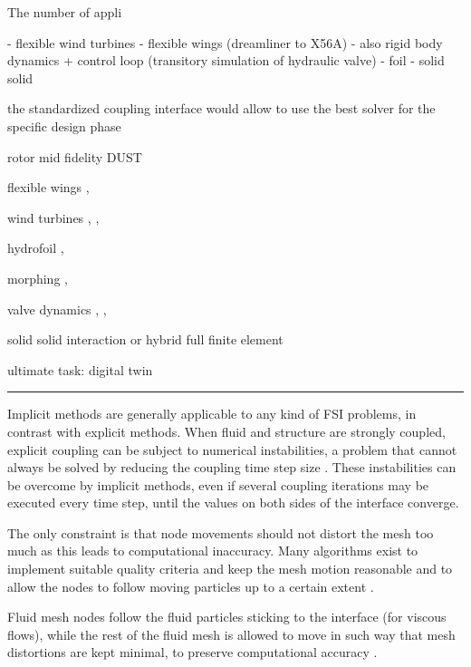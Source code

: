 The number of appli


- flexible wind turbines
- flexible wings (dreamliner to X56A)
- also rigid body dynamics + control loop (transitory simulation of hydraulic valve)
- foil
- solid solid 




the standardized coupling interface would allow to use the best solver for the specific design phase 

rotor \cite{quaranta2004toward}  \cite{cavagna2009simulation}  \cite{masarati2011coupled} mid fidelity DUST \cite{cocco2020simulation}

flexible wings \cite{pusch2019aeroelastic}, \cite{waitman2020h}

wind turbines \cite{guerri2008fluid}, \cite{rasheed2014comprehensive}, \cite{roul2020fluid} 

hydrofoil \cite{lupu2018absolute}, \cite{bousquet2017control}

morphing \cite{chanzy2018analysis}, \cite{li2018review}

valve dynamics \cite{amirante2006flow}, \cite{lisowski2013three}, \cite{frosina2017modeling}

solid solid interaction or hybrid full finite element \cite{cumnuantip2018assessment}



ultimate task: digital twin \cite{semeraro2021digital}


\noindent\rule{\textwidth}{1pt}









Implicit methods are generally applicable to any kind of FSI problems, in contrast with explicit methods. When fluid and structure are strongly coupled, explicit coupling can be subject to numerical instabilities, a problem that cannot always be solved by reducing the coupling time step size \cite{van2009added}. These instabilities can be overcome by implicit methods, even if several coupling iterations may be executed every time step, until the values on both sides of the interface converge.

The only constraint is that node movements should not distort the mesh too much as this leads to computational inaccuracy. Many algorithms exist to implement suitable quality criteria and keep the mesh motion reasonable and to allow the nodes to follow moving particles up to a certain extent \cite{de2007mesh}.

Fluid mesh nodes follow the fluid particles sticking to the interface (for viscous flows), while the rest of the fluid mesh is allowed to move in such way that mesh distortions are kept minimal, to preserve computational accuracy \cite{ramm1998fluid}.




